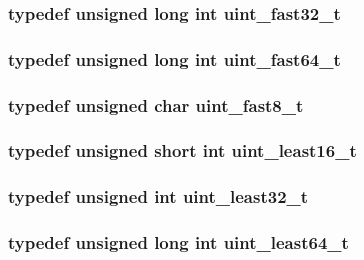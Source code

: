 \subsubsection[{uint\_\-fast32\_\-t}]{\setlength{\rightskip}{0pt plus 5cm}typedef unsigned long int {\bf uint\_\-fast32\_\-t}}\label{tp_8c_a8a5d6c5353ff297fd0797e654772361b}
\subsubsection[{uint\_\-fast64\_\-t}]{\setlength{\rightskip}{0pt plus 5cm}typedef unsigned long int {\bf uint\_\-fast64\_\-t}}\label{tp_8c_adb82e9165af5b2bfe1aa4cb777a9edfb}
\subsubsection[{uint\_\-fast8\_\-t}]{\setlength{\rightskip}{0pt plus 5cm}typedef unsigned char {\bf uint\_\-fast8\_\-t}}\label{tp_8c_a2d31063fef649c85396fb28130ef9795}
\subsubsection[{uint\_\-least16\_\-t}]{\setlength{\rightskip}{0pt plus 5cm}typedef unsigned short int {\bf uint\_\-least16\_\-t}}\label{tp_8c_a1bae72af13d35bac8eb9424db7e27bf1}
\subsubsection[{uint\_\-least32\_\-t}]{\setlength{\rightskip}{0pt plus 5cm}typedef unsigned int {\bf uint\_\-least32\_\-t}}\label{tp_8c_a9a3e3b9785e918fb2c7d964efebd2130}
\subsubsection[{uint\_\-least64\_\-t}]{\setlength{\rightskip}{0pt plus 5cm}typedef unsigned long int {\bf uint\_\-least64\_\-t}}\label{tp_8c_a29c34cf2857e3b4b4b421cd5fd711cf6}
